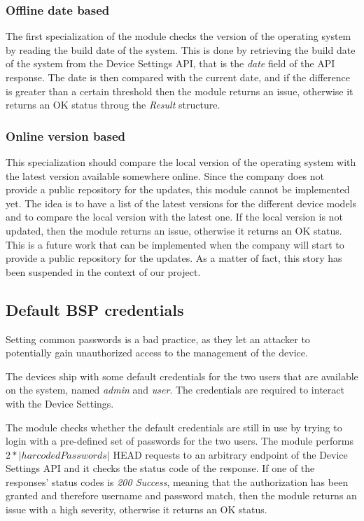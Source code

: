 \subsubsection{Offline date based}

The first specialization of the module checks the version of the operating system by reading the build date of the system. This is done by retrieving the build date of the system from the Device Settings API, that is the \textit{date} field of the API response. The date is then compared with the current date, and if the difference is greater than a certain threshold then the module returns an issue, otherwise it returns an OK status throug the \textit{Result} structure.

\subsubsection{Online version based}

This specialization should compare the local version of the operating system with the latest version available somewhere online. Since the company does not provide a public repository for the updates, this module cannot be implemented yet. The idea is to have a list of the latest versions for the different device models and to compare the local version with the latest one. If the local version is not updated, then the module returns an issue, otherwise it returns an OK status. This is a future work that can be implemented when the company will start to provide a public repository for the updates. As a matter of fact, this story has been suspended in the context of our project.

\subsection{Default BSP credentials}

Setting common passwords is a bad practice, as they let an attacker to potentially gain unauthorized access to the management of the device.

The devices ship with some default credentials for the two users that are available on the system, named \textit{admin} and \textit{user}. The credentials are required to interact with the Device Settings.

The module checks whether the default credentials are still in use by trying to login with a pre-defined set of passwords for the two users. The module performs $2*|harcodedPasswords|$ HEAD requests to an arbitrary endpoint of the Device Settings API and it checks the status code of the response. If one of the responses' status codes is \textit{200 Success}, meaning that the authorization has been granted and therefore username and password match, then the module returns an issue with a high severity, otherwise it returns an OK status.

